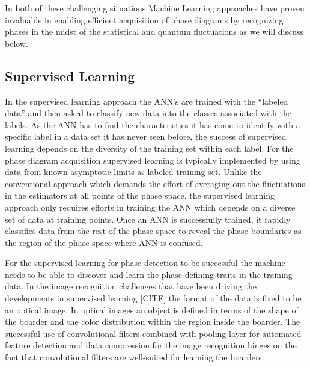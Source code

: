 \documentclass[aps,prb,floatfix,amsmath,amssymb,amsfonts,10pt,floatfix,longbibliography]{revtex4-1}
\begin{document}
In both of these challenging situations Machine Learning approaches have proven invaluable in enabling efficient acquisition of phase diagrams by recognizing phases in the midst of the statistical and quantum fluctuations as we will discuss below. 


\subsection{Supervised Learning}
In the supervised learning approach the ANN's are trained with the ``labeled data'' and then asked to classify new data into the classes associated with the labels. As the ANN has to find the characteristics it has come to identify with a specific label in a data set it has never seen before, the success of supervised learning depends on the diversity of the training set within each label. 
For the phase diagram acquisition supervised learning is typically implemented by using data from known asymptotic limits as labeled training set\cite{Carrasquilla2017, Zhang2017,Zhang2017a,Broecker2017,Broecker2017a,Schindler2017,Ohtsuki2016,Nieuwenburg2017}. Unlike the conventional approach which demands the effort of averaging out the fluctuations in the estimators at all points of the phase space, the supervised learning approach only requires efforts in training the ANN which depends on a diverse set of data at training points. Once an ANN is successfully trained, it rapidly classifies data from the rest of the phase space to reveal the phase boundaries as the region of the phase space where ANN is confused\cite{Nieuwenburg2017}.

For the supervised learning for phase detection to be successful the machine needs to be able to discover and learn the phase defining traits in the training data. In the image recognition challenges that have been driving the developments in supervised learning [CITE] the format of the data is fixed to be an optical image. In optical images an object is defined in terms of the shape of the boarder and the color distribution within the region inside the boarder. The successful use of convolutional filters combined with pooling layer for automated feature detection and data compression for the image recognition hinges on the fact that convolutional filters are well-suited for learning the boarders. 
\end{document}
